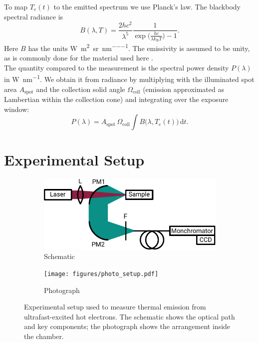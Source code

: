 \documentclass[
	parskip=half,
	a4paper,
]{scrarticle}
\begin{document}
To map \(T_e(t)\) to the emitted spectrum we use Planck’s law. The blackbody spectral radiance is
\begin{equation}
    B(\lambda,T)
    = \frac{2hc^{2}}{\lambda^{5}}
      \frac{1}{\exp\bigl(\tfrac{hc}{\lambda k_{\mathrm B}T}\bigr)-1}.
    \label{eq:B}
\end{equation}
Here \(B\) has the units \si{\watt\per\metre\squared\per\steradian\per\nano\metre}. The emissivity is assumed to be unity, as is commonly done for the material used here \cite{sapritsky_black-body_1995}.\\
The quantity compared to the measurement is the spectral power density \(P(\lambda)\) in \si{\watt\per\nano\metre}. We obtain it from radiance by multiplying with the illuminated spot area \(A_{\text{spot}}\) and the collection solid angle \(\Omega_{\text{coll}}\) (emission approximated as Lambertian within the collection cone) and integrating over the exposure window:
\begin{equation}
      P(\lambda) = A_{\text{spot}}\,\Omega_{\text{coll}}
      \int B\bigl(\lambda, T_e(t)\bigr)\,\mathrm dt.
      \label{eq:P}
\end{equation}


\section{Experimental Setup}
\begin{figure}
    \centering
    \begin{subfigure}{3.5in}
        \centering
        \includegraphics{figures/setup.pdf}
        \caption{Schematic}
    \end{subfigure}\hfill
    \begin{subfigure}{2in}
        \centering
        \texttt{[image: figures/photo\_setup.pdf]}
        \caption{Photograph}
    \end{subfigure}
    \caption{Experimental setup used to measure thermal emission from ultrafast-excited hot electrons. The schematic shows the optical path and key components; the photograph shows the arrangement inside the chamber.}
    \label{fig:setup}
\end{figure}
\end{document}
